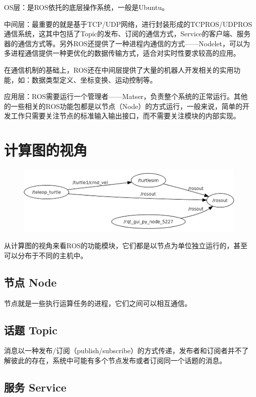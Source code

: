 \documentclass[9pt, oneside]{book}
\begin{document}
OS层：是ROS依托的底层操作系统，一般是Ubuntu。

中间层：最重要的就是基于TCP/UDP网络，进行封装形成的TCPROS/UDPROS通信系统，这其中包括了Topic的发布、订阅的通信方式，Service的客户端、服务器的通信方式等。另外ROS还提供了一种进程内通信的方式——Nodelet，可以为多进程通信提供一种更优化的数据传输方式，适合对实时性要求较高的应用。

在通信机制的基础上，ROS还在中间层提供了大量的机器人开发相关的实用功能，如：数据类型定义、坐标变换、运动控制等。

应用层：ROS需要运行一个管理者——Matser，负责整个系统的正常运行。其他的一些相关的ROS功能包都是以节点（Node）的方式运行，一般来说，简单的开发工作只需要关注节点的标准输入输出接口，而不需要关注模块的内部实现。

\section{计算图的视角}

\begin{figure}[H]
    \centering
    \includegraphics[width=0.7\linewidth]{image/计算图.png}
\end{figure}

从计算图的视角来看ROS的功能模块，它们都是以节点为单位独立运行的，甚至可以分布于不同的主机中。

\subsection{节点 Node}

节点就是一些执行运算任务的进程，它们之间可以相互通信。

\subsection{话题 Topic}

消息以一种发布/订阅（publish/subscribe）的方式传递，发布者和订阅者并不了解彼此的存在，系统中可能有多个节点发布或者订阅同一个话题的消息。

\subsection{服务 Service}
\end{document}
